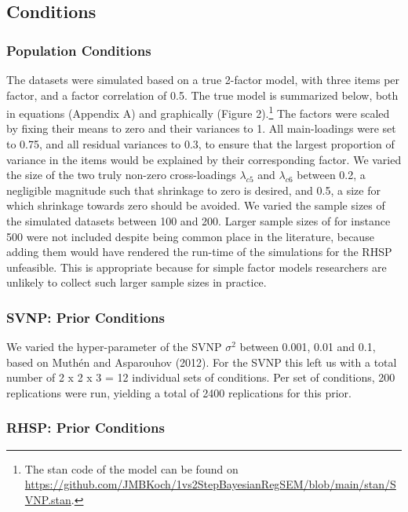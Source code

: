 \documentclass[
  english,
  man, donotrepeattitle,floatsintext]{apa6}
\begin{document}
\hypertarget{conditions}{%
\subsection{Conditions}\label{conditions}}

\hypertarget{population-conditions}{%
\subsubsection{Population Conditions}\label{population-conditions}}

The datasets were simulated based on a true 2-factor model, with three items per factor, and a factor correlation of 0.5. The true model is summarized below, both in equations (Appendix A) and graphically (Figure 2).\footnote{The stan code of the model can be found on \url{https://github.com/JMBKoch/1vs2StepBayesianRegSEM/blob/main/stan/SVNP.stan}.} The factors were scaled by fixing their means to zero and their variances to 1. All main-loadings were set to 0.75, and all residual variances to 0.3, to ensure that the largest proportion of variance in the items would be explained by their corresponding factor. We varied the size of the two truly non-zero cross-loadings \(\lambda_{c 5}\) and \(\lambda_{c 6}\) between 0.2, a negligible magnitude such that shrinkage to zero is desired, and 0.5, a size for which shrinkage towards zero should be avoided. We varied the sample sizes of the simulated datasets between 100 and 200. Larger sample sizes of for instance 500 were not included despite being common place in the literature, because adding them would have rendered the run-time of the simulations for the RHSP unfeasible. This is appropriate because for simple factor models researchers are unlikely to collect such larger sample sizes in practice.

\hypertarget{svnp-prior-conditions}{%
\subsubsection{SVNP: Prior Conditions}\label{svnp-prior-conditions}}

We varied the hyper-parameter of the SVNP \(\sigma^2\) between 0.001, 0.01 and 0.1, based on Muthén and Asparouhov (2012). For the SVNP this left us with a total number of 2 x 2 x 3 = 12 individual sets of conditions. Per set of conditions, 200 replications were run, yielding a total of 2400 replications for this prior.

\hypertarget{rhsp-prior-conditions}{%
\subsubsection{RHSP: Prior Conditions}\label{rhsp-prior-conditions}}
\end{document}
